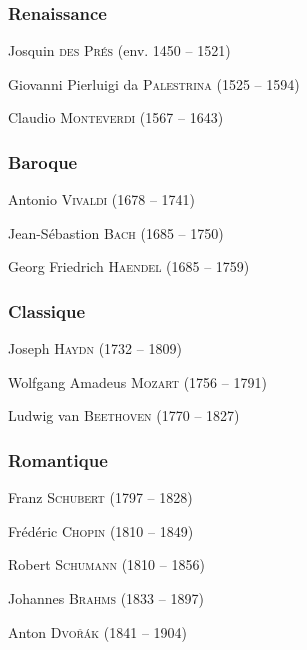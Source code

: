 \documentclass[11pt]{scrreprt}
\begin{document}
\subsubsection{Renaissance}
\begin{description}
\item Josquin \textsc{des Prés} (env. 1450 -- 1521)
\item Giovanni Pierluigi da \textsc{Palestrina} (1525 -- 1594)
\item Claudio \textsc{Monteverdi} (1567 -- 1643)
\end{description}

\subsubsection{Baroque}
\begin{description}
\item Antonio \textsc{Vivaldi} (1678 -- 1741)
\item Jean-Sébastion \textsc{Bach} (1685 -- 1750)
\item Georg Friedrich \textsc{Haendel} (1685 -- 1759)
\end{description}

\subsubsection{Classique}
\begin{description}
\item Joseph \textsc{Haydn} (1732 -- 1809)
\item Wolfgang Amadeus \textsc{Mozart} (1756 -- 1791)
\item Ludwig van \textsc{Beethoven} (1770 -- 1827)
\end{description}

\subsubsection{Romantique}
\begin{description}
\item Franz \textsc{Schubert} (1797 -- 1828)
\item Frédéric \textsc{Chopin} (1810 -- 1849)
\item Robert \textsc{Schumann} (1810 -- 1856)
\item Johannes \textsc{Brahms} (1833 -- 1897)
\item Anton \textsc{Dvo\v{r}ák} (1841 -- 1904)
\end{description}
\end{document}
